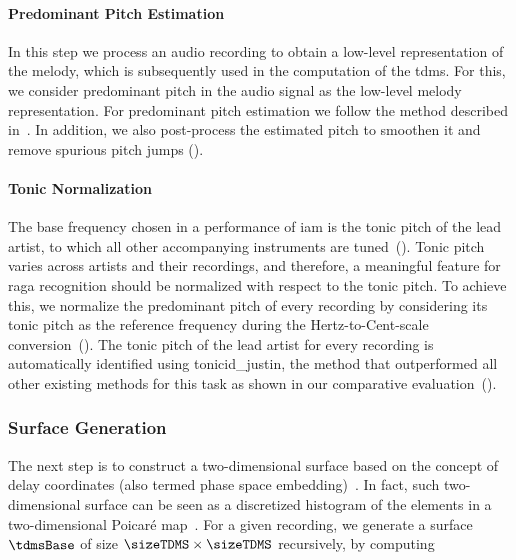 \paragraph{Predominant Pitch Estimation}

In this step we process an audio recording to obtain a low-level representation of the melody, which is subsequently used in the computation of the \gls{tdms}. For this, we consider predominant pitch in the audio signal as the low-level melody representation. For predominant pitch estimation we follow the method described in~. In addition, we also post-process the estimated pitch to smoothen it and remove spurious pitch jumps (). 

\paragraph{Tonic Normalization}

The base frequency chosen in a performance of \gls{iam} is the tonic pitch of the lead artist, to which all other accompanying instruments are tuned~(). 
Tonic pitch varies across artists and their recordings, and therefore, a meaningful feature for \gls{raga} recognition should be normalized with respect to the tonic pitch. To achieve this, we normalize the predominant pitch of every recording by considering its tonic pitch as the reference frequency during the Hertz-to-Cent-scale conversion~(). The tonic pitch of the lead artist for every recording is automatically identified using \acrshort{tonicid_justin}, the method that outperformed all other existing methods for this task as shown in our comparative evaluation~(). 

\subsubsection{Surface Generation}
\label{sec:tdms_surface_generation}

The next step is to construct a two-dimensional surface based on the concept of delay coordinates (also termed phase space embedding)~\citep{takens1981detecting, Kantz04BOOK}. In fact, such two-dimensional surface can be seen as a discretized histogram of the elements in a two-dimensional Poicar\'e map~\citep{Kantz04BOOK}. For a given recording, we generate a surface $\tdmsBase$ of size $\sizeTDMS\times\sizeTDMS$ recursively, by computing

